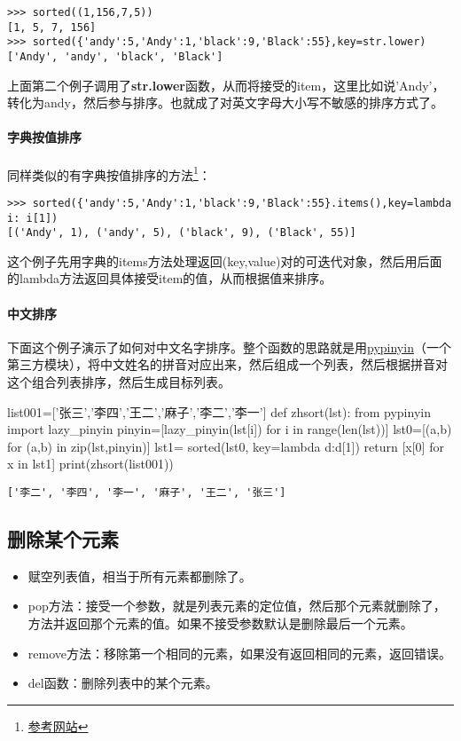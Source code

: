 \documentclass[12pt,oneside]{book}
\begin{document}
\begin{common-format}
\begin{Verbatim}
>>> sorted((1,156,7,5))
[1, 5, 7, 156]
>>> sorted({'andy':5,'Andy':1,'black':9,'Black':55},key=str.lower)
['Andy', 'andy', 'black', 'Black']
\end{Verbatim}

上面第二个例子调用了\textbf{str.lower}函数，从而将接受的item，这里比如说'Andy'，转化为andy，然后参与排序。也就成了对英文字母大小写不敏感的排序方式了。

\paragraph{字典按值排序}
同样类似的有字典按值排序的方法\footnote{\href{http://www.cnpythoner.com/post/266.html}{参考网站}}：

\begin{Verbatim}
>>> sorted({'andy':5,'Andy':1,'black':9,'Black':55}.items(),key=lambda i: i[1])
[('Andy', 1), ('andy', 5), ('black', 9), ('Black', 55)]
\end{Verbatim}

这个例子先用字典的items方法处理返回(key,value)对的可迭代对象，然后用后面的lambda方法返回具体接受item的值，从而根据值来排序。


\paragraph{中文排序}
下面这个例子演示了如何对中文名字排序。整个函数的思路就是用\href{https://github.com/mozillazg/python-pinyin}{pypinyin}（一个第三方模块），将中文姓名的拼音对应出来，然后组成一个列表，然后根据拼音对这个组合列表排序，然后生成目标列表。
\begin{tcbpython}[]
list001=['张三','李四','王二','麻子','李二','李一']
def zhsort(lst):
    from pypinyin import  lazy_pinyin
    pinyin=[lazy_pinyin(lst[i]) for i in range(len(lst))]
    lst0=[(a,b) for (a,b) in zip(lst,pinyin)]
    lst1= sorted(lst0, key=lambda d:d[1])
    return [x[0] for x in lst1]
print(zhsort(list001))
\end{tcbpython}
\begin{Verbatim}
['李二', '李四', '李一', '麻子', '王二', '张三']
\end{Verbatim}



\subsection{删除某个元素}
\begin{itemize}
\item 赋空列表值，相当于所有元素都删除了。 
\item pop方法：接受一个参数，就是列表元素的定位值，然后那个元素就删除了，方法并返回那个元素的值。如果不接受参数默认是删除最后一个元素。
\item remove方法：移除第一个相同的元素，如果没有返回相同的元素，返回错误。
\item del函数：删除列表中的某个元素。
\end{itemize}


\end{common-format}
\end{document}

